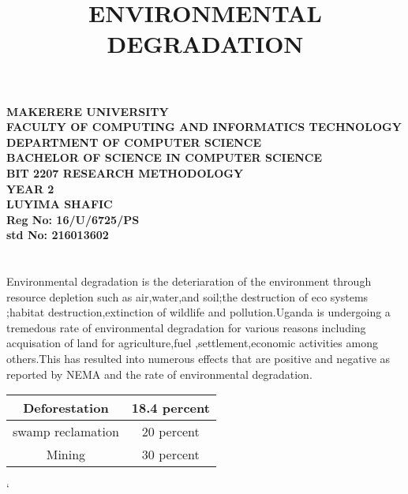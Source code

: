\documentclass[a4paper,12pt]{article}
\begin{document}
\begin{Huge}
\begin{center}
\begin{normalsize}

\textbf{MAKERERE UNIVERSITY } \\
\textbf{FACULTY OF COMPUTING AND INFORMATICS TECHNOLOGY} \\
\textbf{DEPARTMENT OF COMPUTER SCIENCE} \\
\textbf{BACHELOR OF SCIENCE IN COMPUTER SCIENCE} \\
\textbf{BIT 2207 RESEARCH METHODOLOGY} \\
\textbf{YEAR 2} \\


\textbf{\sc LUYIMA SHAFIC } \\
\textbf{\sc Reg No: 16/U/6725/PS } \\
\textbf{\sc std No: 216013602}\\
\end{normalsize}
\end{center}
\end{Huge}
\newpage

\title{ENVIRONMENTAL DEGRADATION}
\maketitle    
\section{}
Environmental degradation is the deteriaration of the environment through resource depletion such as air,water,and soil;the destruction of eco systems ;habitat destruction,extinction of wildlife and pollution.Uganda is undergoing a tremedous rate of environmental degradation for various reasons including acquisation of land for agriculture,fuel ,settlement,economic activities among others.This has resulted into numerous effects that are positive and negative as reported by NEMA and the rate of environmental degradation.

\begin{center}
\begin{tabular}{|c|c|}
\hline
Deforestation & 18.4 percent \\ [0.5ex]
\hline
swamp reclamation & 20 percent \\ [0.5ex]
\hline
Mining & 30 percent \\ [0.5ex]

\hline
\end{tabular}
\end{center}`
\end{document}
